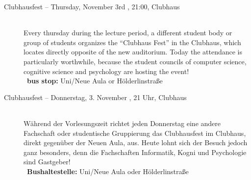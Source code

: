 \begin{description}
\ifml
    \item[Clubhausfest -- Thursday, November 3rd \YEAR, 21:00, Clubhaus]\ \\
        Every thursday during the lecture period, a different student body or group of students organizes the "`Clubhaus Fest"' in the Clubhaus, which locates directly opposite of the new auditorium. Today the attendance is particularly worthwhile, because the student councils of computer science, cognitive science and psychology are hosting the event! \\

        ~\textbf{bus stop:} Uni/Neue Aula or Hölderlinstraße
\else
    \item[Clubhausfest -- Donnerstag, 3. November \YEAR, 21 Uhr, Clubhaus]\ \\
        Während der Vorlesungszeit richtet jeden Donnerstag eine andere Fachschaft oder studentische Gruppierung das Clubhausfest im Clubhaus, direkt gegenüber der Neuen Aula, aus. Heute lohnt sich der Besuch jedoch ganz besonders, denn die Fachschaften Informatik, Kogni und Psychologie sind Gastgeber! \\
		~\textbf{Bushaltestelle:} Uni/Neue Aula oder Hölderlinstraße
\fi



\end{description}
